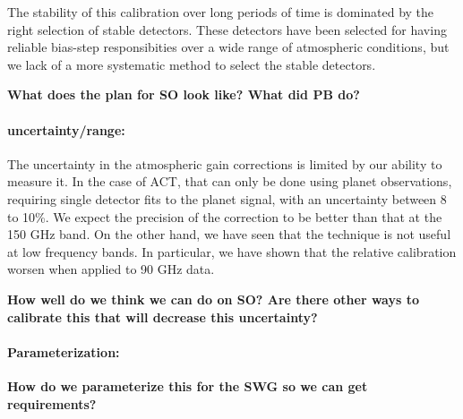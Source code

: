 The stability of this calibration over long periods of time is dominated by the right selection of stable detectors. These detectors have been selected for having reliable bias-step responsibities over a wide range of atmospheric conditions, but we lack of a more systematic method to select the stable detectors. 

\textbf{What does the plan for SO look like? What did PB do?}

\paragraph{uncertainty/range:}
The uncertainty in the atmospheric gain corrections is limited by our ability to measure it. In the case of ACT, that can only be done using planet observations, requiring single detector fits to the planet signal, with an uncertainty between 8 to 10\%. We expect the precision of the correction to be better than that at the 150 GHz band. On the other hand, we have seen that the technique is not useful at low frequency bands. In particular, we have shown that the relative calibration worsen when applied to 90 GHz data.

\textbf{How well do we think we can do on SO? Are there other ways to calibrate this that will decrease this uncertainty?}

\paragraph{Parameterization:}
\textbf{How do we parameterize this for the SWG so we can get requirements?}
